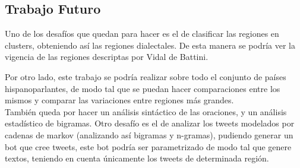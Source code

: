 
\subsection{Trabajo Futuro}

Uno de los desafíos que quedan para hacer es el de clasificar las regiones en clusters, obteniendo así las regiones dialectales. De esta manera se podría ver la vigencia de las regiones descriptas por Vidal de Battini.

Por otro lado, este trabajo se podría realizar sobre todo el conjunto de países hispanoparlantes, de modo tal que se puedan hacer comparaciones entre los mismos y comparar las variaciones entre regiones más grandes.\\
También queda por hacer un análisis sintáctico de las oraciones, y un análisis estadístico de bigramas.
Otro desafío es el de analizar los tweets modelados por cadenas de markov (analizando así bigramas y n-gramas), pudiendo generar un bot que cree tweets, este bot podría ser parametrizado de modo tal que genere textos, teniendo en cuenta únicamente los tweets de determinada región.

